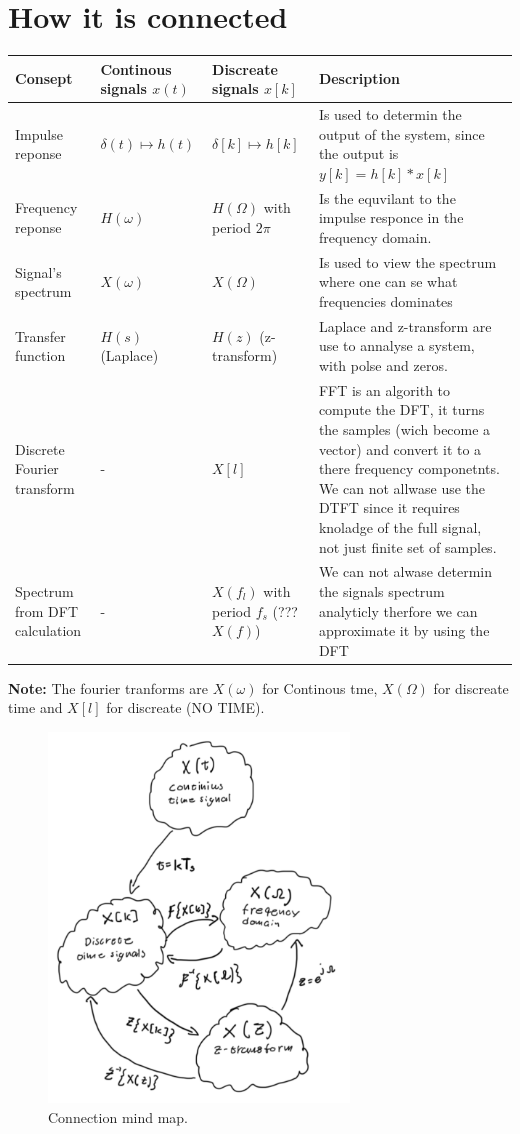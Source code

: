 

\section{How it is connected}
\begin{tabular}{|m{2cm}|m{3cm}|m{4cm}|m{6cm}|}
    \hline
    Consept & Continous signals $x(t)$ & Discreate signals $x[k]$ & Description \\
    \hline
    \hline
    Impulse reponse & $\delta(t) \mapsto h(t)$ & $\delta[k] \mapsto h[k]$ & Is used to determin the output of the system, since the output is $y[k]=h[k]*x[k]$ \\
    \hline
    Frequency reponse & $H(\omega)$ & $H(\Omega)$ with period $2\pi$ & Is the equvilant to the impulse responce in the frequency domain. \\
    \hline
    Signal's spectrum & $X(\omega)$ & $X(\Omega)$ & Is used to view the spectrum where one can se what frequencies dominates \\
    \hline
    Transfer function & $H(s)$ (Laplace) & $H(z)$ (z-transform) & Laplace and z-transform are use to annalyse a system, with polse and zeros. \\
    \hline
    Discrete Fourier transform & - & $X[l]$ & FFT is an algorith to compute the DFT, it turns the samples (wich become a vector) and convert it to a there frequency componetnts. We can not allwase use the DTFT since it requires knoladge of the full signal, not just finite set of samples. \\
    \hline
    Spectrum from DFT calculation & - & $X(f_l)$ with period $f_s$ (???$X(f)$) & We can not alwase determin the signals spectrum analyticly therfore we can approximate it by using the DFT \\
    \hline
\end{tabular}
\textbf{Note:} The fourier tranforms are $X(\omega)$ for Continous tme, $X(\Omega)$ for discreate time and 
$X[l]$ for discreate (NO TIME).  

\begin{figure}[H]
   \centering
   \includegraphics[width=8cm]{image/connection_mind-map.pdf} 
   \caption{Connection mind map.}
   \label{fig:connection_mind-map}
\end{figure}


